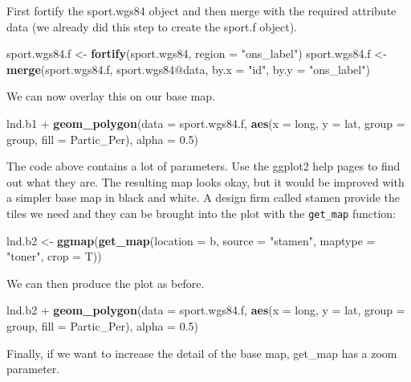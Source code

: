\documentclass[]{article}
\newenvironment{Shaded}{}{}
\newcommand{\KeywordTok}[1]{\textcolor[rgb]{0.00,0.44,0.13}{\textbf{{#1}}}}
\newcommand{\DataTypeTok}[1]{\textcolor[rgb]{0.56,0.13,0.00}{{#1}}}
\newcommand{\FloatTok}[1]{\textcolor[rgb]{0.25,0.63,0.44}{{#1}}}
\newcommand{\StringTok}[1]{\textcolor[rgb]{0.25,0.44,0.63}{{#1}}}
\newcommand{\NormalTok}[1]{{#1}}
\begin{document}
First fortify the sport.wgs84 object and then merge with the required
attribute data (we already did this step to create the sport.f object).

\begin{Shaded}
\begin{Highlighting}[]
\NormalTok{sport.wgs84.f <- }\KeywordTok{fortify}\NormalTok{(sport.wgs84, }\DataTypeTok{region =} \StringTok{"ons_label"}\NormalTok{)}
\NormalTok{sport.wgs84.f <- }\KeywordTok{merge}\NormalTok{(sport.wgs84.f, sport.wgs84@data, }\DataTypeTok{by.x =} \StringTok{"id"}\NormalTok{, }\DataTypeTok{by.y =} \StringTok{"ons_label"}\NormalTok{)}
\end{Highlighting}
\end{Shaded}
We can now overlay this on our base map.

\begin{Shaded}
\begin{Highlighting}[]
\NormalTok{lnd.b1 + }\KeywordTok{geom_polygon}\NormalTok{(}\DataTypeTok{data =} \NormalTok{sport.wgs84.f, }\KeywordTok{aes}\NormalTok{(}\DataTypeTok{x =} \NormalTok{long, }\DataTypeTok{y =} \NormalTok{lat, }\DataTypeTok{group =} \NormalTok{group, }
    \DataTypeTok{fill =} \NormalTok{Partic_Per), }\DataTypeTok{alpha =} \FloatTok{0.5}\NormalTok{)}
\end{Highlighting}
\end{Shaded}
The code above contains a lot of parameters. Use the ggplot2 help pages
to find out what they are. The resulting map looks okay, but it would be
improved with a simpler base map in black and white. A design firm
called stamen provide the tiles we need and they can be brought into the
plot with the \texttt{get\_map} function:

\begin{Shaded}
\begin{Highlighting}[]
\NormalTok{lnd.b2 <- }\KeywordTok{ggmap}\NormalTok{(}\KeywordTok{get_map}\NormalTok{(}\DataTypeTok{location =} \NormalTok{b, }\DataTypeTok{source =} \StringTok{"stamen"}\NormalTok{, }\DataTypeTok{maptype =} \StringTok{"toner"}\NormalTok{, }
    \DataTypeTok{crop =} \NormalTok{T))}
\end{Highlighting}
\end{Shaded}
We can then produce the plot as before.

\begin{Shaded}
\begin{Highlighting}[]
\NormalTok{lnd.b2 + }\KeywordTok{geom_polygon}\NormalTok{(}\DataTypeTok{data =} \NormalTok{sport.wgs84.f, }\KeywordTok{aes}\NormalTok{(}\DataTypeTok{x =} \NormalTok{long, }\DataTypeTok{y =} \NormalTok{lat, }\DataTypeTok{group =} \NormalTok{group, }
    \DataTypeTok{fill =} \NormalTok{Partic_Per), }\DataTypeTok{alpha =} \FloatTok{0.5}\NormalTok{)}
\end{Highlighting}
\end{Shaded}
Finally, if we want to increase the detail of the base map, get\_map has
a zoom parameter.
\end{document}

